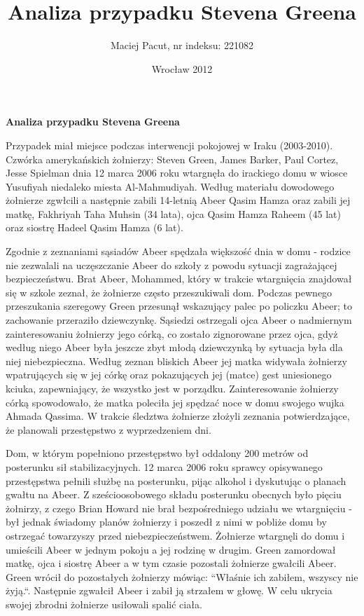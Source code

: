 \documentclass[12pt,a4paper]{article}
\title{Analiza przypadku Stevena Greena}
\author{Maciej Pacut, nr indeksu: 221082}
\date{Wrocław 2012}
\begin{document}
\begin{center}
\LARGE{\textbf{Analiza przypadku Stevena Greena}}
\end{center}

Przypadek miał miejsce podczas interwencji pokojowej w Iraku
(2003-2010). Czwórka amerykańskich żołnierzy: Steven Green, James
Barker, Paul Cortez, Jesse Spielman dnia 12 marca 2006 roku wtargnęła
do irackiego domu w wiosce Yusufiyah niedaleko miesta Al-Mahmudiyah.
Według materiału dowodowego żołnierze zgwłcili a następnie zabili
14-letnią Abeer Qasim Hamza oraz zabili jej matkę, Fakhriyah Taha
Muhsin (34 lata), ojca Qasim Hamza Raheem (45 lat) oraz siostrę Hadeel
Qasim Hamza (6 lat).


Zgodnie z zeznaniami sąsiadów Abeer spędzała większość dnia w domu -
rodzice nie zezwalali na uczęszczanie Abeer do szkoły z powodu sytuacji
zagrażającej bezpieczeństwu. Brat Abeer, Mohammed, który w trakcie wtargnięcia
znajdował się w szkole zeznał, że żołnierze często przeszukiwali dom.
Podczas pewnego przeszukania szeregowy Green przesunął wskazujący
palec po policzku Abeer; to zachowanie przeraziło dziewczynkę. Sąsiedzi
ostrzegali ojca Abeer o nadmiernym zainteresowaniu żołnierzy jego
córką, co zostało zignorowane przez ojca, gdyż według niego Abeer była
jeszcze zbyt młodą dziewczynką by sytuacja była dla niej
niebezpieczna. Według zeznan bliskich Abeer jej matka widywała
żołnierzy wpatrujących się w jej córkę oraz pokazujących jej (matce)
gest uniesionego kciuka, zapewniający, że wszystko jest w porządku.
Zainteresowanie żołnierzy córką spowodowało, że matka poleciła jej
spędzać noce w domu swojego wujka Ahmada Qassima. W trakcie śledztwa
żołnierze złożyli zeznania potwierdzające, że planowali przestępstwo z
wyprzedzeniem dni.


Dom, w którym popełniono przestępstwo był oddalony 200 metrów od
posterunku sił stabilizacyjnych. 12 marca 2006 roku sprawcy
opisywanego przestępstwa pełnili służbę na posterunku, pijąc alkohol i
dyskutując o planach gwałtu na Abeer. Z sześcioosobowego składu
posterunku obecnych było pięciu żołnirzy, z czego Brian Howard nie
brał bezpośredniego udziału we wtargnięciu - był jednak świadomy
planów żołnierzy i poszedł z nimi w pobliże domu by ostrzegać
towarzyszy przed niebezpieczeństwem. Żołnierze wtargnęli do domu i
umieścili Abeer w jednym pokoju a jej rodzinę w drugim. Green
zamordował matkę, ojca i siostrę Abeer a w tym czasie pozostali
żołnierze gwałcili Abeer. Green wrócił do pozostałych żołnierzy
mówiąc: ``Właśnie ich zabiłem, wszyscy nie żyją.``. Następnie zgwałcił
Abeer i zabił ją strzałem w głowę. W celu ukrycia swojej zbrodni
żołnierze usiłowali spalić ciała.
\end{document}
